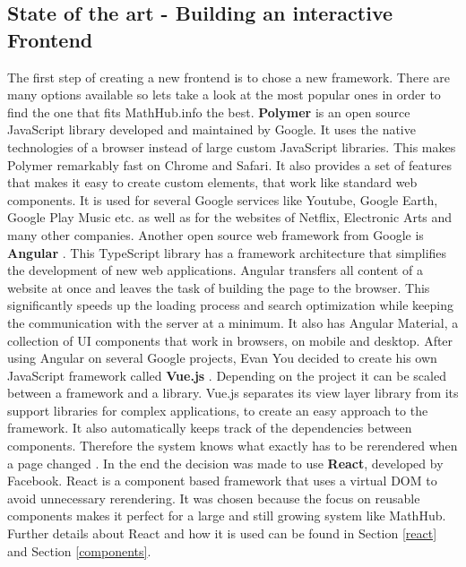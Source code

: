 \documentclass[11pt,a4paper]{article}
\begin{document}
\subsection{State of the art - Building an interactive Frontend} \label{SoA}
The first step of creating a new frontend is to chose a new framework.
There are many options available so lets take a look at the most popular ones in order to find the one that fits MathHub.info the best.
\newline \newline
\textbf{Polymer} \cite{polymer} is an open source JavaScript library developed and maintained by Google.
It uses the native technologies of a browser instead of large custom JavaScript libraries.
This makes Polymer remarkably fast on Chrome and Safari.
It also provides a set of features that makes it easy to create custom elements, that work like standard web components.
It is used for several Google services like Youtube, Google Earth, Google Play Music etc. as well as for the websites of Netflix, Electronic Arts and many other companies. 
\newline \newline
Another open source web framework from Google is \textbf{Angular} \cite{angular}.
This TypeScript library has a framework architecture that simplifies the development of new web applications.
Angular transfers all content of a website at once and leaves the task of building the page to the browser.
This significantly speeds up the loading process and search optimization while keeping the communication with the server at a minimum. 
It also has Angular Material, a collection of UI components that work in browsers, on mobile and desktop.
\newline \newline
After using Angular on several Google projects, Evan You decided to create his own JavaScript framework called \textbf{Vue.js} \cite{vuewiki}.
Depending on the project it can be scaled between a framework and a library.
Vue.js separates its view layer library from its support libraries for complex applications, to create an easy approach to the framework.
It also automatically keeps track of the dependencies between components.
Therefore the system knows what exactly has to be rerendered when a page changed \cite{vuegit}.
\newline \newline
In the end the decision was made to use \textbf{React}, developed by Facebook.
React is a component based framework that uses a virtual DOM to avoid unnecessary rerendering.
It was chosen because the focus on reusable components makes it perfect for a large and still growing system like MathHub.
Further details about React and how it is used can be found in Section \ref{react} and Section \ref{components}.
\end{document}
